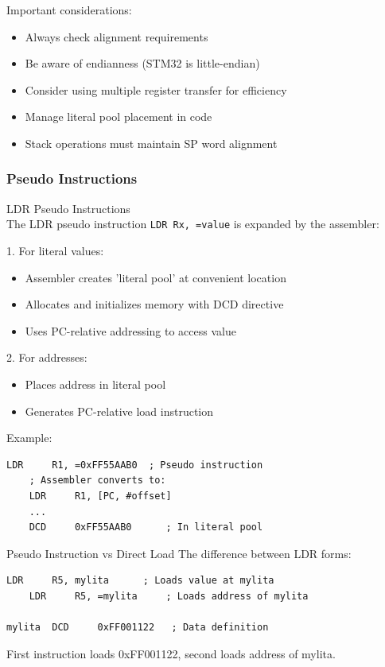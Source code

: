 \begin{remark}
Important considerations:
\begin{itemize}
  \item Always check alignment requirements
  \item Be aware of endianness (STM32 is little-endian)
  \item Consider using multiple register transfer for efficiency
  \item Manage literal pool placement in code
  \item Stack operations must maintain SP word alignment
\end{itemize}
\end{remark}

\subsubsection{Pseudo Instructions}

\begin{definition}{LDR Pseudo Instructions}\\
The LDR pseudo instruction \texttt{LDR Rx, =value} is expanded by the assembler:

1. For literal values:
\begin{itemize}
  \item Assembler creates 'literal pool' at convenient location
  \item Allocates and initializes memory with DCD directive
  \item Uses PC-relative addressing to access value
\end{itemize}

2. For addresses:
\begin{itemize}
  \item Places address in literal pool
  \item Generates PC-relative load instruction
\end{itemize}

Example:
\begin{lstlisting}[language=armasm, style=basesmol]
    LDR     R1, =0xFF55AAB0  ; Pseudo instruction
    ; Assembler converts to:
    LDR     R1, [PC, #offset]
    ...
    DCD     0xFF55AAB0      ; In literal pool
\end{lstlisting}
\end{definition}

\begin{example2}{Pseudo Instruction vs Direct Load}
The difference between LDR forms:
\begin{lstlisting}[language=armasm, style=basesmol]
    LDR     R5, mylita      ; Loads value at mylita
    LDR     R5, =mylita     ; Loads address of mylita

mylita  DCD     0xFF001122   ; Data definition
\end{lstlisting}

First instruction loads 0xFF001122, second loads address of mylita.
\end{example2}

